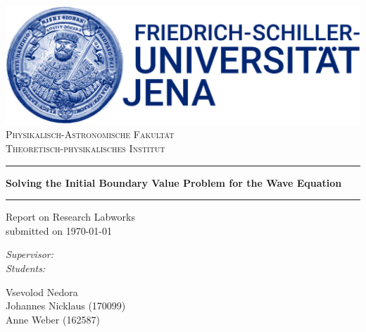 \documentclass[a4paper,headsepline,12pt,oneside]{scrartcl}
\begin{document}
\begin{titlepage}

\thispagestyle{empty}
    \makeatletter
    \centering
    \includegraphics[scale = 0.2]{graphics/fsulogo.jpg}\\[1.0 cm]
    \textsc{\Large Physikalisch-Astronomische Fakultät\\Theoretisch-physikalisches Institut}
    \vspace{1cm} \hrule \vspace{0.4cm}
    \Large \textbf{Solving the Initial Boundary Value Problem for the Wave Equation}
    \vspace{0.4cm} \hrule \vspace{1cm}
    \Large Report on Research Labworks \\
    submitted on \today \\
    \vspace{1cm}
    {\centering
    }

    \begin{minipage}[t]{0.4\textwidth}
        \begin{flushright} \large
            \emph{Supervisor:}\\
            \emph{Students:}
         \end{flushright}
    \end{minipage}%
    \hspace{0.5cm}
    \begin{minipage}[t]{0.4\textwidth}
    \begin{flushleft} \large
          Vsevolod Nedora \\
          Johannes Nicklaus (170099) \\ Anne Weber (162587)
    \end{flushleft}
    \end{minipage}\\[2 cm]
    \makeatother
\end{titlepage}
\end{document}
